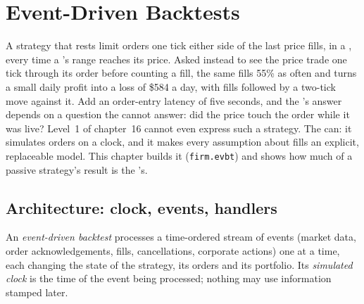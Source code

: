 \chapter{Event-Driven Backtests}\label{ch:rs:event-driven-backtests}

A strategy that rests limit orders one tick either side of the last price fills, in a  , every time a 's range reaches its
price. Asked instead to see the price trade one tick through its order before counting a fill, the same  fills 55\% as often and turns
a small daily profit into a loss of \$584 a day, with fills followed by a two-tick move against it. Add an order-entry latency of five seconds,
and the 's answer depends on a question the  cannot answer: did the price touch the order while it was live? Level~1 of
chapter~16 cannot even express such a strategy. The  can: it simulates orders on a clock, and it makes every assumption
about fills an explicit, replaceable model. This chapter builds it (\texttt{firm.evbt}) and shows how much of a passive strategy's result is the
's.

\section{Architecture: clock, events, handlers}

\begin{definition}\label{def:rs:event-driven-backtests:evbt}
An \emph{event-driven backtest} processes a time-ordered stream of events (market data, order acknowledgements,
fills, cancellations, corporate actions) one at a time, each changing the state of the strategy, its orders and its portfolio. Its
\emph{simulated clock} is the time of the event being processed; nothing may use information stamped later.
\end{definition}

